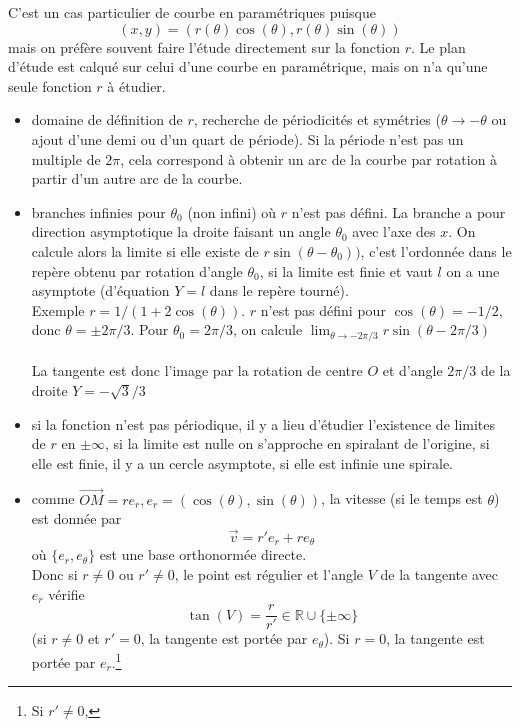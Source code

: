 \documentclass[a4paper,11pt]{article}
\newcommand{\R}{{\mathbb{R}}}
\begin{document}
\begin{giacjshere}
C'est un cas particulier de courbe en param\'etriques puisque
$$ (x,y)=(r(\theta) \cos(\theta), r(\theta) \sin(\theta))$$
mais on pr\'ef\`ere souvent faire l'\'etude directement sur la
fonction $r$. Le plan d'\'etude est calqu\'e sur celui
d'une courbe en param\'etrique, mais on n'a qu'une seule fonction
$r$ \`a \'etudier.
\begin{itemize}
\item domaine de d\'efinition de $r$, recherche
de p\'eriodicit\'es et sym\'etries ($\theta \rightarrow -\theta$
ou ajout d'une demi ou d'un quart de p\'eriode).
Si la période n'est pas un multiple de $2\pi$, cela correspond
à obtenir un arc de la courbe par rotation à partir d'un autre arc
de la courbe.
\item branches infinies pour $\theta_0$ (non infini)
où $r$ n'est pas d\'efini. La branche a pour direction
asymptotique la droite faisant un angle $\theta_0$ avec
l'axe des $x$. On calcule alors la limite si elle existe de 
$r \sin(\theta-\theta_0))$, c'est l'ordonnée dans
le repère obtenu par rotation d'angle $\theta_0$, si la limite
est finie et vaut $l$
on a une asymptote (d'équation $Y=l$ dans le repère tourné).\\
Exemple $r=1/(1+2\cos(\theta))$. $r$ n'est pas d\'efini pour
$\cos(\theta)=-1/2$, donc $\theta=\pm 2\pi/3$. Pour $\theta_0=2\pi/3$,
on calcule $\lim_{\theta \rightarrow -2\pi/3}r\sin(\theta-2\pi/3)$\\
\\
La tangente est donc l'image par la rotation de centre $O$ et d'angle
$2\pi/3$ de la droite $Y=-\sqrt{3}/3$
\item si la fonction n'est pas périodique, il y a lieu
d'étudier l'existence de limites de $r$ en $\pm \infty$, si la limite
est nulle on s'approche en spiralant de l'origine, si
elle est finie, il y a un cercle asymptote, si elle est
infinie une spirale.
\item comme $\overrightarrow{OM}=r e_r, 
e_r=(\cos(\theta),\sin(\theta))$, 
la vitesse (si le temps est $\theta$) est donnée par 
$$\overrightarrow{v}= r' e_r + r e_\theta$$
où $\{ e_r,e_\theta \}$ est une base orthonormée directe.\\
Donc si $r\neq 0$ ou $r' \neq 0$, le point est régulier et
l'angle $V$ de la tangente avec $e_r$ vérifie 
$$\tan(V)=\frac{r}{r'} \in \R \cup \{ \pm \infty \} $$
(si $r \neq 0$ et $r'=0$, la tangente est portée par $e_\theta$).
Si $r=0$, la tangente est portée par $e_r$.\footnote{Si $r'\neq 0$,
}
\end{itemize}
\end{giacjshere}
\end{document}
